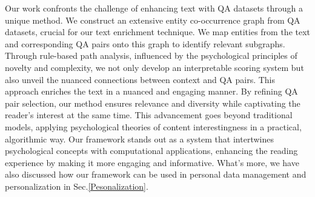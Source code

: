 \documentclass[11pt]{article}
\begin{document}

Our work confronts the challenge of enhancing text with QA datasets through a unique method. We construct an extensive entity co-occurrence graph from QA datasets, crucial for our text enrichment technique. We map entities from the text and corresponding QA pairs onto this graph to identify relevant subgraphs. Through rule-based path analysis, influenced by the psychological principles of novelty and complexity, we not only develop an interpretable scoring system but also unveil the nuanced connections between context and QA pairs. This approach enriches the text in a nuanced and engaging manner. By refining QA pair selection, our method ensures relevance and diversity while captivating the reader's interest at the same time. This advancement goes beyond traditional models, applying psychological theories of content interestingness in a practical, algorithmic way. Our framework stands out as a system that intertwines psychological concepts with computational applications, enhancing the reading experience by making it more engaging and informative. What's more, we have also discussed how our framework can be used in personal data management and personalization in Sec.\ref{Pesonalization}.

\end{document}
